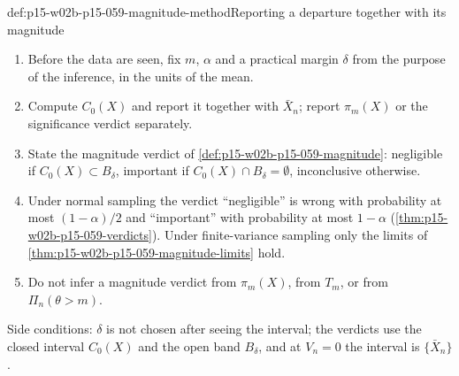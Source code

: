 \begin{hbmethod}{def:p15-w02b-p15-059-magnitude-method}{Reporting a departure together with its magnitude}
\begin{enumerate}
\item Before the data are seen, fix \(m\), \(\alpha\) and a practical
margin \(\delta\) from the purpose of the inference, in the units of the
mean.
\item Compute \(C_0(X)\) and report it together with \(\bar X_n\); report
\(\pi_m(X)\) or the significance verdict separately.
\item State the magnitude verdict of \cref{def:p15-w02b-p15-059-magnitude}:
negligible if \(C_0(X)\subset B_\delta\), important if
\(C_0(X)\cap B_\delta=\emptyset\), inconclusive otherwise.
\item Under normal sampling the verdict ``negligible'' is wrong with
probability at most \((1-\alpha)/2\) and ``important'' with probability at
most \(1-\alpha\) (\cref{thm:p15-w02b-p15-059-verdicts}). Under
finite-variance sampling only the limits of
\cref{thm:p15-w02b-p15-059-magnitude-limits} hold.
\item Do not infer a magnitude verdict from \(\pi_m(X)\), from \(T_m\), or
from \(\Pi_n(\theta>m)\).
\end{enumerate}
Side conditions: \(\delta\) is not chosen after seeing the interval; the
verdicts use the closed interval \(C_0(X)\) and the open band
\(B_\delta\), and at \(V_n=0\) the interval is \(\{\bar X_n\}\).
\end{hbmethod}

